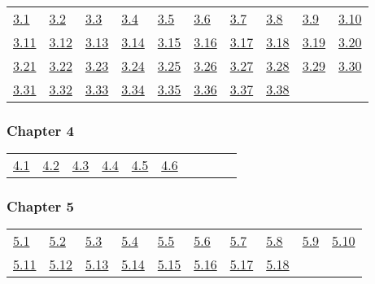 \begin{tabular}{llllllllll}
\hyperref[Figure 3.1]{3.1} &
\hyperref[Figure 3.2]{3.2} &
\hyperref[Figure 3.3]{3.3} &
\hyperref[Figure 3.4]{3.4} &
\hyperref[Figure 3.5]{3.5} &
\hyperref[Figure 3.6]{3.6} &
\hyperref[Figure 3.7]{3.7} &
\hyperref[Figure 3.8]{3.8} &
\hyperref[Figure 3.9]{3.9} &
\hyperref[Figure 3.10]{3.10}
\\ 
\hyperref[Figure 3.11]{3.11} &
\hyperref[Figure 3.12]{3.12} &
\hyperref[Figure 3.13]{3.13} &
\hyperref[Figure 3.14]{3.14} &
\hyperref[Figure 3.15]{3.15} &
\hyperref[Figure 3.16]{3.16} &
\hyperref[Figure 3.17]{3.17} &
\hyperref[Figure 3.18]{3.18} &
\hyperref[Figure 3.19]{3.19} &
\hyperref[Figure 3.20]{3.20}
\\ 
\hyperref[Figure 3.21]{3.21} &
\hyperref[Figure 3.22]{3.22} &
\hyperref[Figure 3.23]{3.23} &
\hyperref[Figure 3.24]{3.24} &
\hyperref[Figure 3.25]{3.25} &
\hyperref[Figure 3.26]{3.26} &
\hyperref[Figure 3.27]{3.27} &
\hyperref[Figure 3.28]{3.28} &
\hyperref[Figure 3.29]{3.29} &
\hyperref[Figure 3.30]{3.30}
\\ 
\hyperref[Figure 3.31]{3.31} &
\hyperref[Figure 3.32]{3.32} &
\hyperref[Figure 3.33]{3.33} &
\hyperref[Figure 3.34]{3.34} &
\hyperref[Figure 3.35]{3.35} &
\hyperref[Figure 3.36]{3.36} &
\hyperref[Figure 3.37]{3.37} &
\hyperref[Figure 3.38]{3.38} &
\end{tabular} 

\subsubsection*{Chapter 4} 

\begin{tabular}{llllllllll}
\hyperref[Figure 4.1]{4.1} &
\hyperref[Figure 4.2]{4.2} &
\hyperref[Figure 4.3]{4.3} &
\hyperref[Figure 4.4]{4.4} &
\hyperref[Figure 4.5]{4.5} &
\hyperref[Figure 4.6]{4.6} &
\end{tabular} 

\subsubsection*{Chapter 5} 

\begin{tabular}{llllllllll}
\hyperref[Figure 5.1]{5.1} &
\hyperref[Figure 5.2]{5.2} &
\hyperref[Figure 5.3]{5.3} &
\hyperref[Figure 5.4]{5.4} &
\hyperref[Figure 5.5]{5.5} &
\hyperref[Figure 5.6]{5.6} &
\hyperref[Figure 5.7]{5.7} &
\hyperref[Figure 5.8]{5.8} &
\hyperref[Figure 5.9]{5.9} &
\hyperref[Figure 5.10]{5.10}
\\ 
\hyperref[Figure 5.11]{5.11} &
\hyperref[Figure 5.12]{5.12} &
\hyperref[Figure 5.13]{5.13} &
\hyperref[Figure 5.14]{5.14} &
\hyperref[Figure 5.15]{5.15} &
\hyperref[Figure 5.16]{5.16} &
\hyperref[Figure 5.17]{5.17} &
\hyperref[Figure 5.18]{5.18} &
\end{tabular} 

